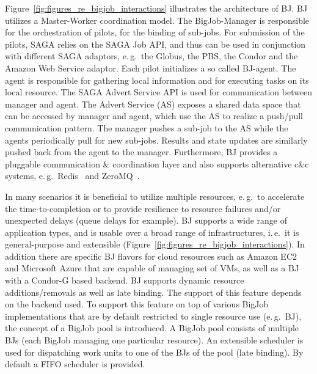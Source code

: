\documentclass[]{svjour3}
\begin{document}
Figure~\ref{fig:figures_re_bigjob_interactions} illustrates the
architecture of BJ. BJ utilizes a Master-Worker coordination model. The
BigJob-Manager is responsible for the orchestration of pilots, for the
binding of sub-jobs. For submission of the pilots, SAGA relies on the
SAGA Job API, and thus can be used in conjunction with different SAGA
adaptors, e.\,g.\ the Globus, the PBS, the Condor and the Amazon Web
Service adaptor. Each pilot initializes a so called BJ-agent. The
agent is responsible for gathering local information and for executing
tasks on its local resource. The SAGA Advert Service API is used for
communication between manager and agent. The Advert Service (AS)
exposes a shared data space that can be accessed by manager and agent,
which use the AS to realize a push/pull communication pattern.
The manager pushes a sub-job to the AS while the agents periodically pull
for new sub-jobs. Results and state updates are similarly pushed back from
the agent to the manager. Furthermore, BJ provides a pluggable
communication \& coordination layer and also supports alternative c\&c
systems, e.\,g.\ Redis~\cite{redis} and ZeroMQ~\cite{zmq}.

In many scenarios it is beneficial to utilize multiple resources,
e.\,g.\ to accelerate the time-to-completion or to provide resilience
to resource failures and/or unexpected delays (queue delays for
example).  BJ supports a wide range of application types, and is
usable over a broad range of infrastructures, i.\,e.\ it is
general-purpose and extensible
(Figure~\ref{fig:figures_re_bigjob_interactions}). In addition there
are specific BJ flavors for cloud resources such as Amazon EC2 and
Microsoft Azure that are capable of managing set of VMs, as well as a
BJ with a Condor-G based backend.  BJ supports dynamic resource
additions/removals as well as late binding. The support of this
feature depends on the backend used. To support this feature on top of
various BigJob implementations that are by default restricted to
single resource use (e.\,g.\ BJ), the concept of a BigJob pool is
introduced. A BigJob pool consists of multiple BJs (each BigJob
managing one particular resource). An extensible scheduler is used for
dispatching work units to one of the BJs of the pool (late
binding). By default a FIFO scheduler is provided.

\end{document}
